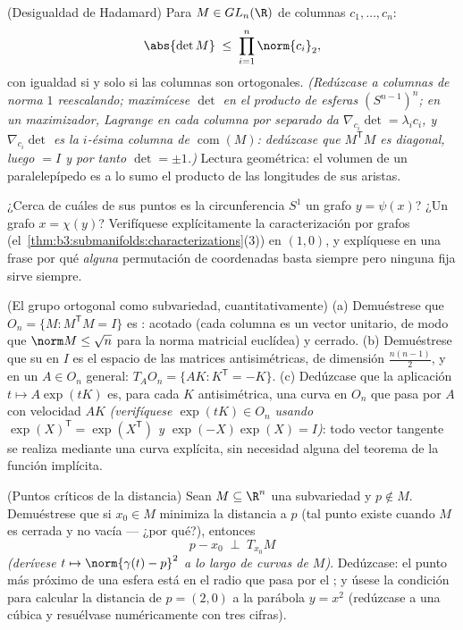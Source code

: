 \begin{exercise}[$\star\star\star$]\label{exo:b3:submanifolds:9}
(Desigualdad de Hadamard) Para $M \in GL_n(\R)$ de columnas
$c_1, \dots, c_n$:
\[
\abs{\det M} \;\leq\; \prod_{i=1}^n\norm{c_i}_2 ,
\]
con igualdad si y solo si las columnas son ortogonales. \emph{(Redúzcase
a columnas de norma $1$ reescalando; maximícese $\det$ en el producto
 de esferas $(S^{n-1})^n$; en
un maximizador, Lagrange en cada columna por separado da
$\nabla_{c_i}\det =
\lambda_ic_i$, y $\nabla_{c_i}\det$ es la $i$-ésima columna de
$\operatorname{com}(M)$: dedúzcase que $M^{\mathsf T}M$ es diagonal,
luego $= I$ y por tanto $\det = \pm1$.)} Lectura geométrica: el volumen
de un paralelepípedo es a lo sumo el producto de las longitudes de sus
aristas.
\end{exercise}

\begin{exercise}[$\star\star$]\label{exo:b3:submanifolds:10}
¿Cerca de cuáles de sus puntos es la circunferencia $S^1$ un grafo $y =
\psi(x)$? ¿Un grafo $x = \chi(y)$? Verifíquese explícitamente la
caracterización por grafos
(el~\cref{thm:b3:submanifolds:characterizations}(3)) en $(1, 0)$, y
explíquese en una frase por qué \emph{alguna} permutación de coordenadas
basta siempre pero ninguna fija sirve siempre.
\end{exercise}

\begin{exercise}[$\star\star$]\label{exo:b3:submanifolds:11}
(El grupo ortogonal como subvariedad, cuantitativamente) (a) Demuéstrese
que $O_n = \{M : M^{\mathsf T}M = I\}$ es
: acotado (cada columna es un
vector unitario, de modo que $\norm M \leq
\sqrt n$ para la norma matricial euclídea) y cerrado. (b) Demuéstrese
que su  en $I$ es
el espacio de las matrices antisimétricas, de dimensión
$\frac{n(n-1)}2$, y en un $A \in O_n$ general:
$T_AO_n = \{AK : K^{\mathsf T} =
-K\}$. (c) Dedúzcase que la aplicación $t \mapsto A\exp(tK)$ es, para
cada $K$ antisimétrica, una curva en $O_n$ que pasa por $A$ con
velocidad $AK$ \emph{(verifíquese $\exp(tK) \in O_n$ usando
$\exp(X)^{\mathsf T} = \exp(X^{\mathsf T})$ y $\exp(-X)\exp(X) = I$)}:
todo vector tangente se realiza mediante una curva explícita, sin
necesidad alguna del teorema de la función implícita.
\end{exercise}

\begin{exercise}[$\star\star$]\label{exo:b3:submanifolds:12}
(Puntos críticos de la distancia) Sean $M \subseteq \R^n$ una
subvariedad y $p \notin M$. Demuéstrese que si $x_0 \in M$ minimiza la
distancia a $p$ (tal punto existe cuando $M$ es cerrada y no vacía ---
¿por qué?), entonces
\[
p - x_0 \;\perp\; T_{x_0}M
\]
\emph{(derívese $t \mapsto \norm{\gamma(t) - p}^2$ a lo largo de curvas
de $M$)}. Dedúzcase: el punto más próximo de una esfera está en el radio
que pasa por el ; y úsese la
condición para calcular la distancia de $p = (2, 0)$ a la parábola
$y = x^2$ (redúzcase a una cúbica y resuélvase numéricamente con tres
cifras).
\end{exercise}


